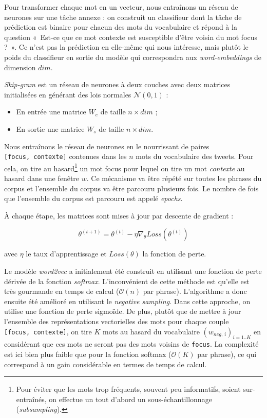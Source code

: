 \documentclass[10pt,french,french]{article}
\let\rmarkdownfootnote\footnote%
\def\footnote{\protect\rmarkdownfootnote}
\begin{document}
Pour transformer chaque mot en un vecteur, nous entraînons un réseau de neurones sur une tâche annexe : on construit un classifieur dont la tâche de prédiction est binaire pour chacun des mots du vocabulaire et répond à la question «~Est-ce que ce mot contexte est susceptible d'être voisin du mot focus ?~».
Ce n'est pas la prédiction en elle-même qui nous intéresse, mais plutôt le poids du classifieur en sortie du modèle qui correspondra aux \emph{word-embeddings} de dimension \(dim\).

\emph{Skip-gram} est un réseau de neurones à deux couches avec deux matrices initialisées en générant des lois normales \(\mathcal N(0,1)\) :

\begin{itemize}
\item
  En entrée une matrice \(W_e\) de taille \(n\times dim\) ;
\item
  En sortie une matrice \(W_s\) de taille \(n\times dim\).
\end{itemize}

Nous entraînons le réseau de neurones en le nourrissant de paires \texttt{{[}focus,\ contexte{]}} contenues dans les \(n\) mots du vocabulaire des tweets.
Pour cela, on tire au hasard\footnote{Pour éviter que les mots trop fréquents, souvent peu informatifs, soient sur-entraînés, on effectue un tout d'abord un sous-échantillonnage (\emph{subsampling}).} un mot focus pour lequel on tire un mot \emph{contexte} au hasard dans une fenêtre \(w\).
Ce mécanisme va être répété sur toutes les phrases du corpus et l'ensemble du corpus va être parcouru plusieurs fois.
Le nombre de fois que l'ensemble du corpus est parcouru est appelé \emph{epochs}.

À chaque étape, les matrices sont mises à jour par descente de gradient :

\[\theta^{(t+1)} = \theta^{(t)} - \eta \nabla_\theta Loss(\theta^{(t)})\]

avec \(\eta\) le taux d'apprentissage et \(Loss(\theta)\) la fonction de perte.

Le modèle \emph{word2vec} a initialement été construit en utilisant une fonction de perte dérivée de la fonction \emph{softmax}.
L'inconvénient de cette méthode est qu'elle est très gourmande en temps de calcul (\(\mathcal O(n)\) par phrase).
L'algorithme a donc ensuite été amélioré en utilisant le \emph{negative sampling}.
Dans cette approche, on utilise une fonction de perte sigmoïde. De plus, plutôt que de mettre à jour l'ensemble des représentations vectorielles des mots pour chaque couple \texttt{{[}focus,\ contexte{]}}, on tire \(K\) mots au hasard du vocabulaire \((w_{neg,\,i})_{i=1..K}\) en considérant que ces mots ne seront pas des mots voisins de \texttt{focus}.
La complexité est ici bien plus faible que pour la fonction softmax (\(\mathcal O(K)\) par phrase), ce qui correspond à un gain considérable en termes de temps de calcul.
\end{document}

